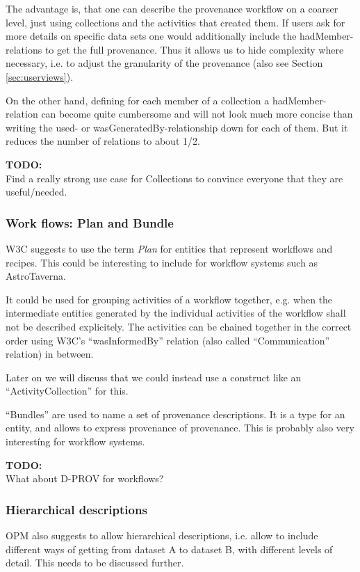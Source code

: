 \documentclass[11pt,a4paper]{ivoa}
\newcommand{\TODO}[1]{%
    \noindent%
    \colorbox{todocolor}{%
            \parbox{0.85\linewidth}{\sffamily \textbf{TODO:}\\
            #1}
    }%
    \vspace{2pt}

}
\begin{document}
The advantage is, that one can describe the provenance workflow on a coarser level, just using collections and the activities that created them. If users ask for more details on specific data sets one would additionally include the hadMember-relations to get the full provenance. Thus it allows us to hide complexity where necessary, i.e. to adjust the granularity of the provenance (also see Section \ref{sec:userviews}).

On the other hand, defining for each member of a collection a hadMember-relation can 
become quite cumbersome and will not look much more concise than writing the used- or wasGeneratedBy-relationship down for each of them. But it reduces the number of relations to about 1/2.

\TODO{Find a really strong use case for Collections to convince everyone that they are useful/needed.}



\subsubsection{Work flows: Plan and Bundle}
W3C suggests to use the term \emph{Plan} for entities that represent workflows and recipes. This could be interesting to include for workflow systems such as AstroTaverna. 

It could be used for grouping activities of a workflow together, e.g. when
the intermediate entities generated by the individual activities of the workflow shall not be described explicitely. The activities can be chained together in the correct order using W3C's ``wasInformedBy'' relation (also called ``Communication'' relation) in between.

Later on we will discuss that we could instead use a construct like an ``ActivityCollection'' for this.

``Bundles'' are used to name a set of provenance descriptions. It is a type for an entity, and allows to express provenance of provenance. This is probably also very interestíng for workflow systems.

\TODO{What about D-PROV for workflows?}

\subsubsection{Hierarchical descriptions}
OPM also suggests to allow hierarchical descriptions, i.e. allow to include different ways of getting from dataset A to dataset B, with different levels of detail. 
This needs to be discussed further. 
\end{document}
